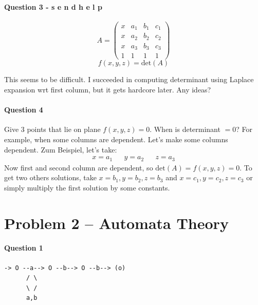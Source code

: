 \paragraph{Question 3 - s e n d h e l p}
\begin{equation*}
    A =
\begin{pmatrix}
x & a_1 & b_1 & c_1 \\
x & a_2 & b_2 & c_2 \\
x & a_3 & b_3 & c_3 \\
1 & 1 & 1 & 1
\end{pmatrix}
\end{equation*}
\begin{equation*}
    f(x,y,z) = \text{det}(A)
\end{equation*}

This seems to be difficult. 
I succeeded in computing determinant using Laplace expansion wrt first column, but it gets hardcore later. Any ideas?

\paragraph{Question 4}
Give 3 points that lie on plane $f(x,y,z) = 0$.
When is determinant $=0$? 
For example, when some columns are dependent.
Let's make some columns dependent.
Zum Beispiel, let's take:
\begin{align*}
    x = a_1 && y = a_2 && z = a_3
\end{align*}
Now first and second column are dependent, so $\text{det}(A) = f(x,y,z) = 0$.
To get two others solutions, take $x = b_1, y = b_2, z = b_3$ and $x = c_1, y = c_2, z = c_3$ or simply multiply the first solution by some constants.


\section{Problem 2 – Automata Theory}

\paragraph{Question 1}
\begin{verbatim}
-> O --a--> O --b--> O --b--> (o)
      / \
      \ /
      a,b
\end{verbatim}

